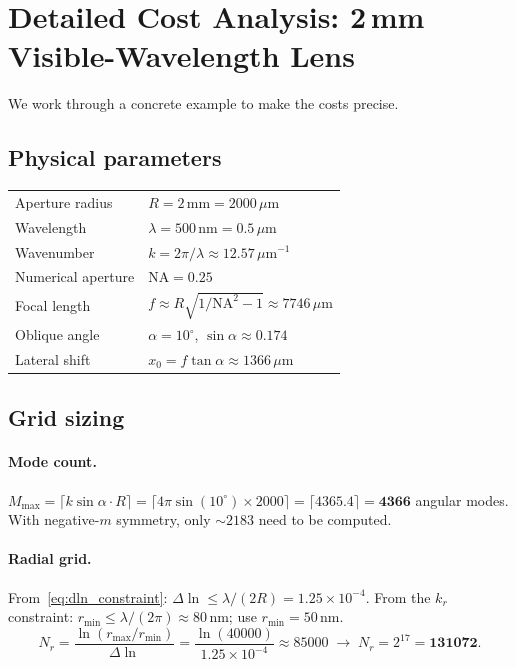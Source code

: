 \documentclass[11pt,a4paper]{article}
\begin{document}
\section{Detailed Cost Analysis: 2\,mm Visible-Wavelength Lens}
\label{sec:cost}

We work through a concrete example to make the costs precise.

\subsection{Physical parameters}

\begin{center}
\begin{tabular}{@{}ll@{}}
\toprule
Aperture radius & $R = 2\,\text{mm} = 2000\,\mu\text{m}$ \\
Wavelength & $\lambda = 500\,\text{nm} = 0.5\,\mu\text{m}$ \\
Wavenumber & $k = 2\pi/\lambda \approx 12.57\,\mu\text{m}^{-1}$ \\
Numerical aperture & $\mathrm{NA} = 0.25$ \\
Focal length & $f \approx R\sqrt{1/\mathrm{NA}^2 - 1} \approx 7746\,\mu\text{m}$ \\
Oblique angle & $\alpha = 10^\circ$,\; $\sin\alpha \approx 0.174$ \\
Lateral shift & $x_0 = f\tan\alpha \approx 1366\,\mu\text{m}$ \\
\bottomrule
\end{tabular}
\end{center}

\subsection{Grid sizing}

\paragraph{Mode count.}
$M_{\max} = \lceil k\sin\alpha\cdot R\rceil = \lceil 4\pi\sin(10^\circ) \times 2000\rceil
= \lceil 4365.4 \rceil = \mathbf{4366}$ angular modes.
With negative-$m$ symmetry, only ${\sim}2183$ need to be computed.

\paragraph{Radial grid.}
From~\eqref{eq:dln_constraint}: $\Delta\!\ln \le \lambda/(2R) = 1.25\times 10^{-4}$.
From the $k_r$ constraint: $r_{\min} \le \lambda/(2\pi) \approx 80\,\text{nm}$; use
$r_{\min} = 50\,\text{nm}$.
\begin{equation}
  N_r = \frac{\ln(r_{\max}/r_{\min})}{\Delta\!\ln}
  = \frac{\ln(40000)}{1.25\times 10^{-4}}
  \approx 85000
  \;\to\; N_r = 2^{17} = \mathbf{131072}.
\end{equation}
\end{document}
